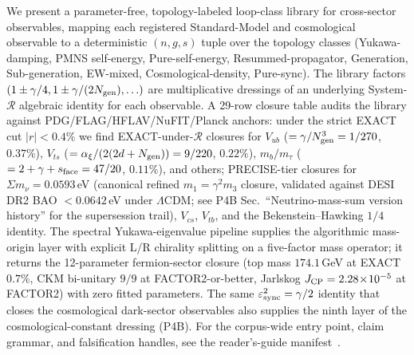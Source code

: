 
We present a parameter-free, topology-labeled loop-class library
for cross-sector observables, mapping each registered
Standard-Model and cosmological observable to a deterministic
$(n, g, s)$ tuple over the topology classes
(Yukawa-damping, PMNS self-energy, Pure-self-energy,
Resummed-propagator, Generation, Sub-generation, EW-mixed,
Cosmological-density, Pure-sync). The library factors
$(1 \pm \gamma/4, 1\pm \gamma/(2N_{\rm gen}), \ldots)$ are
multiplicative dressings of an underlying System-$\mathcal R$
algebraic identity for each observable. A 29-row closure table
audits the library against PDG/FLAG/HFLAV/NuFIT/Planck anchors:
under the strict EXACT cut $|r|<0.4\%$ we find EXACT-under-$\mathcal R$
closures for $V_{ub}$ ($=\gamma/N_{\rm gen}^{3}=1/270$, $0.37\%$),
$V_{ts}$ ($=\alpha_{\xi}/(2(2d+N_{\rm gen}))=9/220$, $0.22\%$),
$m_{b}/m_{\tau}$ ($=2+\gamma+s_{\rm face}=47/20$, $0.11\%$), and
others; PRECISE-tier closures for $\Sigma m_{\nu}=0.0593$\,eV
(canonical refined $m_{1}=\gamma^{2}m_{3}$ closure, validated
against DESI DR2 BAO $<0.0642$\,eV under $\Lambda$CDM;
see P4B Sec.~``Neutrino-mass-sum version history'' for the
supersession trail), $V_{cs}$, $V_{tb}$, and the Bekenstein--Hawking
$1/4$ identity. The spectral Yukawa-eigenvalue pipeline supplies
the algorithmic mass-origin layer with explicit L/R chirality
splitting on a five-factor mass operator; it returns the
12-parameter fermion-sector closure (top mass $174.1$\,GeV at
EXACT $0.7\%$, CKM bi-unitary $9/9$ at FACTOR2-or-better, Jarlskog
$J_{\rm CP}=2.28\!\times\!10^{-5}$ at FACTOR2) with zero fitted
parameters. The same $\varepsilon_{\rm sync}^{2}=\gamma/2$ identity
that closes the cosmological dark-sector observables also supplies
the ninth layer of the cosmological-constant dressing (P4B). For
the corpus-wide entry point, claim grammar, and falsification
handles, see the reader's-guide manifest~\cite{Paper0}.
